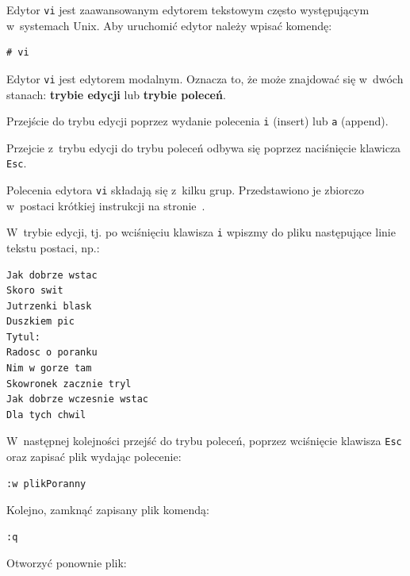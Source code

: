 \begin{example}\label{ex:vi}


Edytor \lstinline[style=MyBashStyle]{vi} jest zaawansowanym edytorem tekstowym często występującym w~systemach Unix. Aby uruchomić edytor należy wpisać komendę:

\begin{lstlisting}[style=MyBashStyle]
# vi
\end{lstlisting}

 Edytor \lstinline[style=MyBashStyle]{vi} jest edytorem modalnym. Oznacza to, że może znajdować się w~dwóch stanach: \textbf{trybie edycji} lub \textbf{trybie poleceń}.

\begin{myitemize}
\item Przejście do trybu edycji poprzez wydanie polecenia \lstinline[style=MyBashStyle]{i} (insert) lub \lstinline[style=MyBashStyle]{a} (append).
\item Przejcie z~trybu edycji do trybu poleceń odbywa się poprzez naciśnięcie klawicza \lstinline[style=MyBashStyle]{Esc}.
\end{myitemize}

Polecenia edytora \lstinline[style=MyBashStyle]{vi} składają się z~kilku grup. Przedstawiono je zbiorczo w~postaci krótkiej instrukcji na stronie~\pageref{viRef}.

W~trybie edycji, tj. po wciśnięciu klawisza \lstinline[style=MyBashStyle]{i} wpiszmy do pliku następujące linie tekstu postaci, np.:


\begin{lstlisting}[style=MyBashStyle]
Jak dobrze wstac
Skoro swit
Jutrzenki blask
Duszkiem pic
Tytul:
Radosc o poranku
Nim w gorze tam
Skowronek zacznie tryl
Jak dobrze wczesnie wstac
Dla tych chwil
\end{lstlisting}

W~następnej kolejności przejść do trybu poleceń, poprzez wciśnięcie klawisza \lstinline[style=MyBashStyle]{Esc} oraz zapisać plik wydając polecenie:

\begin{lstlisting}[style=MyBashStyle]
:w plikPoranny
\end{lstlisting}

Kolejno, zamknąć zapisany plik komendą:

\begin{lstlisting}[style=MyBashStyle]
:q
\end{lstlisting}

Otworzyć ponownie plik:


\end{example}
